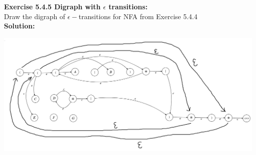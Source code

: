 \documentclass[11pt,fleqn]{article}
\begin{document}
\textbf{Exercise 5.4.5 Digraph with $\epsilon$ transitions:}\\ Draw the digraph of $\epsilon-$transitions for NFA from Exercise 5.4.4\\

\textbf{Solution:}

\begin{center}
\includegraphics[scale=.4]{5.4.5.png}
\end{center}
\end{document}
